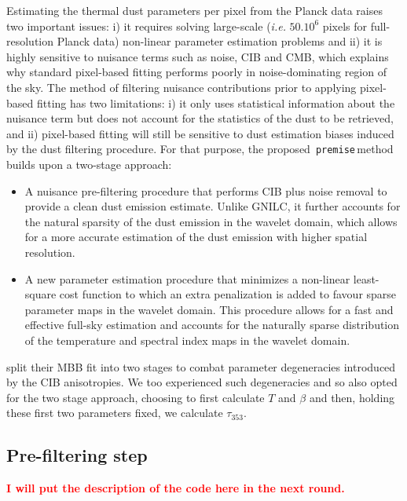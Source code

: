 \documentclass[a4paper,fleqn,usenatbib]{mnras}
\newcommand{\jbc}[1]{\textcolor{Red}{\bf #1}}
\newcommand{\premise}{\texttt{premise}}
\begin{document}
Estimating the thermal dust parameters per pixel from the Planck data raises two important issues: i) it requires solving large-scale ({\it i.e.} $50.10^6$ pixels for full-resolution Planck data) non-linear parameter estimation problems and ii) it is highly sensitive to nuisance terms such as noise, CIB and CMB, which explains why standard pixel-based fitting performs poorly in noise-dominating region of the sky. The method of filtering nuisance contributions prior to applying pixel-based fitting has two limitations: i) it only uses statistical information about the nuisance term but does not account for the statistics of the dust to be retrieved, and ii) pixel-based fitting will still be sensitive to dust estimation biases induced by the dust filtering procedure. For that purpose, the proposed\, \premise \,method builds upon a two-stage approach:
\begin{itemize}
	\item A nuisance pre-filtering procedure that performs CIB plus noise removal to provide a clean dust emission estimate. Unlike GNILC, it further accounts for the natural sparsity of the dust emission in the wavelet domain, which allows for a more accurate estimation of the dust emission with higher spatial resolution.
	\item A new parameter estimation procedure that minimizes a non-linear least-square cost function to which an extra penalization is added to favour sparse parameter maps in the wavelet domain. This procedure allows for a fast and effective full-sky estimation and accounts for the naturally sparse distribution of the temperature and spectral index maps in the wavelet domain.
\end{itemize}

\citet{pr2} split their MBB fit into two stages to combat parameter degeneracies introduced by the CIB anisotropies. We too experienced such degeneracies and so also opted for the two stage approach, choosing to first calculate $T$ and $\beta$ and then, holding these first two parameters fixed, we calculate $\tau_{353}$.

\subsection{Pre-filtering step} \label{cibcontrib}

\jbc{I will put the description of the code here in the next round.}
\end{document}

